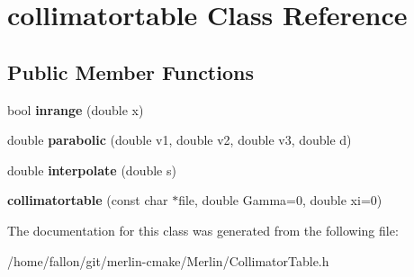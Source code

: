 \hypertarget{classcollimatortable}{}\section{collimatortable Class Reference}
\label{classcollimatortable}
\subsection*{Public Member Functions}
\begin{DoxyCompactItemize}
\item 
\mbox{\label{classcollimatortable_a643ad3aa5ed1fc9b40f1cdb2a72ee235}} 
bool {\bfseries inrange} (double x)
\item 
\mbox{\label{classcollimatortable_a7c5f7dc44d2a1edb34a457bc0a19f171}} 
double {\bfseries parabolic} (double v1, double v2, double v3, double d)
\item 
\mbox{\label{classcollimatortable_a185fb12140e882bc6d5a49359d51924d}} 
double {\bfseries interpolate} (double s)
\item 
\mbox{\label{classcollimatortable_a80bc57031c95f6923894879dc0a90660}} 
{\bfseries collimatortable} (const char $\ast$file, double Gamma=0, double xi=0)
\end{DoxyCompactItemize}


The documentation for this class was generated from the following file\+:\begin{DoxyCompactItemize}
\item 
/home/fallon/git/merlin-\/cmake/\+Merlin/Collimator\+Table.\+h\end{DoxyCompactItemize}

